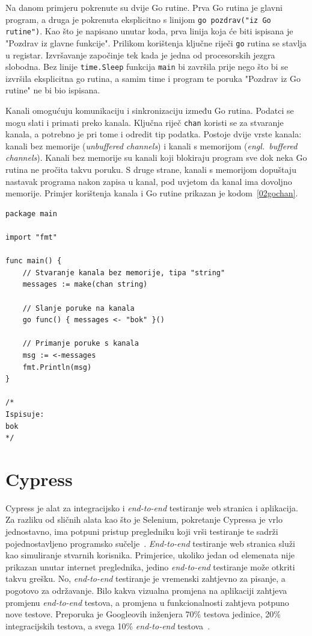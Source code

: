 Na danom primjeru pokrenute su dvije Go rutine. Prva Go rutina je glavni program, a druga je
pokrenuta eksplicitno s linijom \texttt{go pozdrav("iz Go rutine")}. Kao što je napisano unutar
koda, prva linija koja će biti ispisana je "Pozdrav iz glavne funkcije". Prilikom korištenja ključne
riječi \texttt{go} rutina se stavlja u registar. Izvršavanje započinje tek kada je jedna od
procesorskih jezgra slobodna. Bez linije \texttt{time.Sleep} funkcija \texttt{main} bi završila
prije nego što bi se izvršila eksplicitna go rutina, a samim time i program te poruka "Pozdrav iz Go
rutine" ne bi bio ispisana.

Kanali omogućuju komunikaciju i sinkronizaciju između Go rutina. Podatci se mogu slati i primati
preko kanala. Ključna riječ \texttt{chan} koristi se za stvaranje kanala, a potrebno je pri tome i
odredit tip podatka. Postoje dvije vrste kanala: kanali bez memorije (\textit{unbuffered channels})
i kanali s memorijom (\textit{engl.~buffered channels}). Kanali bez memorije su kanali koji
blokiraju program sve dok neka Go rutina ne pročita takvu poruku. S druge strane, kanali s memorijom
dopuštaju nastavak programa nakon zapisa u kanal, pod uvjetom da kanal ima dovoljno memorije.
Primjer korištenja kanala i Go rutine prikazan je kodom~\ref{02gochan}.

\begin{lstlisting}[float=h]
package main

import "fmt"

func main() {
    // Stvaranje kanala bez memorije, tipa "string"
    messages := make(chan string)

    // Slanje poruke na kanala
    go func() { messages <- "bok" }()

    // Primanje poruke s kanala
    msg := <-messages
    fmt.Println(msg)
}

/*
Ispisuje:
bok
*/
\end{lstlisting}



\section{Cypress}
Cypress je alat za integracijsko i \textit{end-to-end} testiranje web stranica i aplikacija. Za
razliku od sličnih alata kao što je Selenium, pokretanje Cypressa je vrlo jednostavno, ima potpuni
pristup pregledniku koji vrši testiranje te sadrži pojednostavljeno programsko
sučelje~\citep{Cypress}. \textit{End-to-end} testiranje web stranica služi kao simuliranje stvarnih
korisnika. Primjerice, ukoliko jedan od elemenata nije prikazan unutar internet preglednika, jedino
\textit{end-to-end} testiranje može otkriti takvu grešku. No, \textit{end-to-end} testiranje je
vremenski zahtjevno za pisanje, a pogotovo za održavanje. Bilo kakva vizualna promjena na aplikaciji
zahtjeva promjenu \textit{end-to-end} testova, a promjena u funkcionalnosti zahtjeva potpuno nove
testove. Preporuka je Googleovih inženjera 70\% testova jedinice, 20\% integracijskih testova, a
svega 10\% \textit{end-to-end} testova~\citep{google-2015}.

